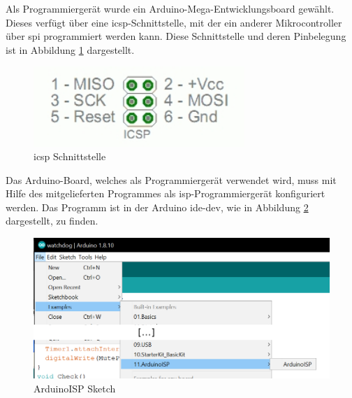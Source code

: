Als Programmiergerät wurde ein Arduino-Mega-Entwicklungsboard gewählt. Dieses verfügt über eine \ac{icsp}-Schnittstelle, mit der ein anderer Mikrocontroller über \ac{spi} programmiert werden kann. Diese Schnittstelle und deren Pinbelegung ist in Abbildung \ref{fig:icsp-header} dargestellt.
\begin{figure}[htbp!]
    \centering
    \includegraphics[width=8cm]{images/hardware-programmierung/ICSPHeader.jpg}
    \caption[\ac{icsp} Schnittstelle \cite{arduino-isp}]
            {\ac{icsp} Schnittstelle \cite[How to wire your boards]{arduino-isp}}
    \label{fig:icsp-header}
\end{figure}

Das Arduino-Board, welches als Programmiergerät verwendet wird, muss mit Hilfe des mitgelieferten Programmes als \ac{isp}-Programmiergerät konfiguriert werden. Das Programm ist in der Arduino \ac{ide-dev}, wie in Abbildung \ref{fig:arduino-isp-sketch} dargestellt, zu finden.
\begin{figure}[htbp!]
    \centering
    \includegraphics[width=.9\linewidth]{images/hardware-programmierung/arduino-isp-sketch.png}
    \caption{ArduinoISP Sketch}
    \label{fig:arduino-isp-sketch}
\end{figure}

